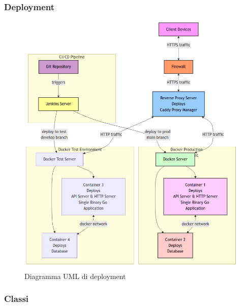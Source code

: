 \documentclass{article}
\begin{document}
\subsubsection{Deployment}

\begin{figure}[H]
    \centering
    \includegraphics[width=12cm]{uml-deployment}
    \caption{Diagramma UML di deployment}
    \label{fig:deployment}
\end{figure}

\subsubsection{Classi}
\end{document}
